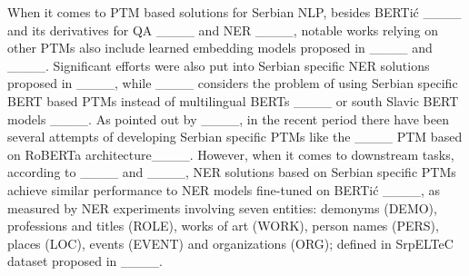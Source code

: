When it comes to PTM based solutions for Serbian NLP, besides BERTić ____ and its derivatives for QA ____ and NER ____, notable works relying on other PTMs also include learned embedding models proposed in ____ and ____. Significant efforts were also put into Serbian specific NER solutions proposed in ____, while ____ considers the problem of using Serbian specific BERT based PTMs instead of multilingual BERTs ____ or south Slavic BERT models ____. As pointed out by ____, in the recent period there have been several attempts of developing Serbian specific PTMs like the ____ PTM based on RoBERTa architecture____. However, when it comes to downstream tasks, according to ____ and ____, NER solutions based on Serbian specific PTMs achieve similar performance to NER models fine-tuned on BERTić ____, as measured by NER experiments involving seven entities: demonyms (DEMO), professions and titles (ROLE), works of art (WORK), person names (PERS), places (LOC), events (EVENT) and organizations (ORG); defined in SrpELTeC dataset proposed in ____.